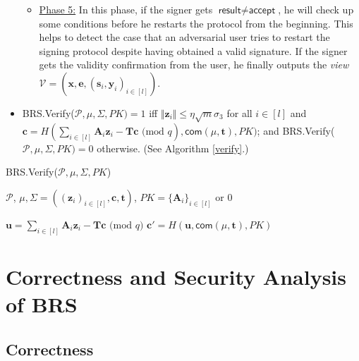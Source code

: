 \documentclass[runningheads]{llncs}
\begin{document}
\begin{itemize}
\begin{itemize}
		\item \underline{Phase 5:} In this phase, if the signer gets $\textsf{result}\neq \textsf{accept}$, he will check up some conditions before he restarts the protocol from the beginning. This helps to detect the case that an adversarial user tries to restart the signing protocol despite having obtained a valid signature. If the signer gets the validity confirmation from the user, he finally outputs the \textit{view}  $\mathcal{V}=(\mathbf{x},\mathbf{e}, (\mathbf{s}_i, \mathbf{y}_i)_{i \in [l]})$.
	\end{itemize} 
	\item  \textsf{BRS.Verify}($\mathcal{P},\mu, \Sigma, PK)=1$ iff $ \Vert \mathbf{z}_i\Vert \leq \eta\sqrt{m}\sigma_3$ for all $i \in [l]$ and 
	$\mathbf{c}=H(\sum_{i \in [l]}\mathbf{A}_i\mathbf{z}_i -\mathbf{T}\mathbf{c}\text{ (mod } q), \mathsf{com}(\mu, \mathbf{t}),PK)$; and \textsf{BRS.Verify}($\mathcal{P},\mu, \Sigma, PK)=0$ otherwise. (See Algorithm \ref{verify}.)
\end{itemize}




\begin{algorithm}
	\caption{\textsf{BRS.Verify}($\mathcal{P},\mu, \Sigma, PK$)}
	
	\begin{algorithmic}[1]
		\REQUIRE $\mathcal{P}$, $\mu, \Sigma=( (\mathbf{z}_i)_{i \in [l]}, \mathbf{c}, \mathbf{t})$, $PK=\{\mathbf{A}_i\}_{i \in [l]}$
		 or 0
		
		
		\STATE $\mathbf{u}=\sum_{i \in [l]}\mathbf{A}_i\mathbf{z}_i -\mathbf{T}\mathbf{c}\text{ (mod } q)$
		\STATE $\mathbf{c}'=H(\mathbf{u}, \mathsf{com}(\mu, \mathbf{t}),PK)$
		\ELSE
		\ENDIF
		
	\end{algorithmic}
	\label{verify}
\end{algorithm}
\normalsize



\section{Correctness and Security Analysis of \textsf{BRS}}  \label{sec5}
\subsection{Correctness}  \label{correct}
\end{document}
